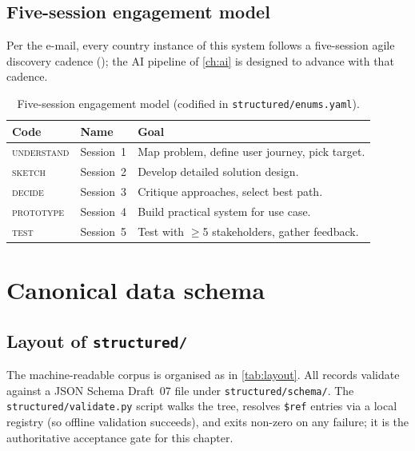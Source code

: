 \documentclass[11pt,a4paper,twoside]{report}
\newcommand{\corpus}{}
\begin{document}
\section{Five-session engagement model}

Per the e-mail, every country instance of this system follows a
five-session agile discovery cadence
(); the AI pipeline of \cref{ch:ai} is designed to
advance with that cadence.

\begin{table}[htbp]
\centering
\caption{Five-session engagement model (codified in
\corpus\texttt{structured/enums.yaml}).}
\label{tab:sessions}
\small
\begin{tabularx}{\linewidth}{@{}l l X@{}}
\toprule
\textbf{Code} & \textbf{Name} & \textbf{Goal} \\ \midrule
\textsc{understand} & Session~1 & Map problem, define user journey, pick target. \\
\textsc{sketch}     & Session~2 & Develop detailed solution design. \\
\textsc{decide}     & Session~3 & Critique approaches, select best path. \\
\textsc{prototype}  & Session~4 & Build practical system for use case. \\
\textsc{test}       & Session~5 & Test with $\geq$5 stakeholders, gather feedback. \\
\bottomrule
\end{tabularx}
\end{table}
\chapter{Canonical data schema}\label{ch:schema}

\section{Layout of \texttt{structured/}}

The machine-readable corpus is organised as in \cref{tab:layout}.
All records validate against a JSON Schema Draft~07 file under
\corpus\texttt{structured/schema/}. The
\corpus\texttt{structured/validate.py} script walks the tree, resolves
\texttt{\$ref} entries via a local registry (so offline validation
succeeds), and exits non-zero on any failure; it is the authoritative
acceptance gate for this chapter.
\end{document}
